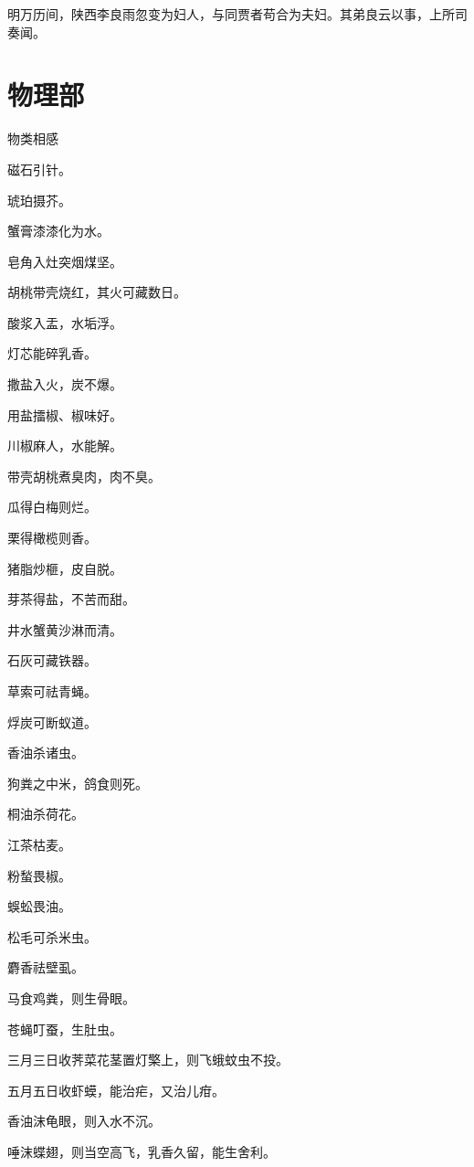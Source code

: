 \documentclass[a4paper,12pt,UTF8,twoside]{ctexbook}
\begin{document}
    明万历间，陕西李良雨忽变为妇人，与同贾者苟合为夫妇。其弟良云以事，上所司奏闻。
    
    \part{物理部}
    
    物类相感
    
    磁石引针。
    
    琥珀摄芥。
    
    蟹膏漆漆化为水。
    
    皂角入灶突烟煤坚。
    
    胡桃带壳烧红，其火可藏数日。
    
    酸浆入盂，水垢浮。
    
    灯芯能碎乳香。
    
    撒盐入火，炭不爆。
    
    用盐擂椒、椒味好。
    
    川椒麻人，水能解。
    
    带壳胡桃煮臭肉，肉不臭。
    
    瓜得白梅则烂。
    
    栗得橄榄则香。
    
    猪脂炒榧，皮自脱。
    
    芽茶得盐，不苦而甜。
    
    井水蟹黄沙淋而清。
    
    石灰可藏铁器。
    
    草索可祛青蝇。
    
    烰炭可断蚁道。
    
    香油杀诸虫。
    
    狗粪之中米，鸽食则死。
    
    桐油杀荷花。
    
    江茶枯麦。
    
    粉蝵畏椒。
    
    蜈蚣畏油。
    
    松毛可杀米虫。
    
    麝香祛壁虱。
    
    马食鸡粪，则生骨眼。
    
    苍蝇叮蚕，生肚虫。
    
    三月三日收荠菜花茎置灯檠上，则飞蛾蚊虫不投。
    
    五月五日收虾蟆，能治疟，又治儿疳。
    
    香油沫龟眼，则入水不沉。
    
    唾沫蝶翅，则当空高飞，乳香久留，能生舍利。
    
\end{document}

